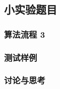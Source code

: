 \begin{comment}
    每个模块已经预留了图片模块，如想使用，须使用如下命名方式  
    callback-[lab no]
    test-[lab no]-[pic no], 其中[pic no]用于同节多个图片
\end{comment}

\renewcommand{\labno}{3} %

\subsection{小实验题目}


\subsubsection{算法流程 \labno}

\begin{comment}
\begin{figure}[H]
  \centering
  \texttt{[image: pic/callback-\\detokenize\\expandafter\{\\labno]}.png} 
  \caption{callback for lab \labno}
\end{figure}
\end{comment}




\subsubsection{测试样例}

\begin{comment}
\begin{figure}[H]
  \centering
  \texttt{[image: pic/test-\\detokenize\\expandafter\{\\labno]}.png} 
  \caption{test for lab \labno}
\end{figure}
\end{comment}


\subsubsection{讨论与思考}

\begin{comment}
\begin{figure}[!htbp]
    \vspace{-0.5cm}
    \centering
    \subfigure[  sub_caption1]{
        \texttt{[image: .jpg]}
    }

    \quad %
    \subfigure[sub_cap2]{
        \texttt{[image: 2.jpg]}
    }
    \quad
    \subfigure[sub_cap3]{
        \texttt{[image: 3.jpg]}
    }

    \quad
    \subfigure[sub_cap4]{
        \texttt{[image: 4.jpg]}
    }
    \caption{ caption}
\end{figure}
\end{comment}